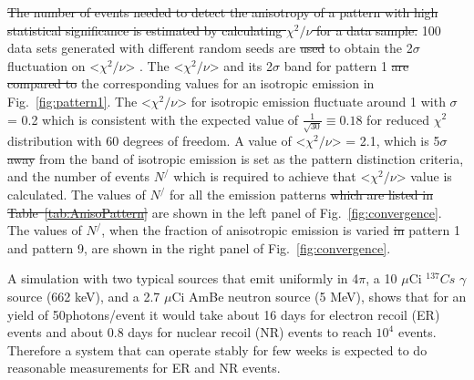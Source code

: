\sout{The number of events needed to detect the anisotropy of a pattern with 
high statistical significance is estimated by calculating $\chi^2/\nu$ 
for a data sample.} 100 data sets generated with different random seeds are 
\sout{used}  to obtain the 2$\sigma$ fluctuation on <$\chi^2/\nu$> . The <$\chi^2/\nu$> 
and its 2$\sigma$ band for pattern 1 \sout{are compared to}  the corresponding values 
for an isotropic emission in Fig.~\ref{fig:pattern1}. The <$\chi^2/\nu$> for 
isotropic emission fluctuate around 1 with $\sigma$ = 0.2 which is consistent with 
the expected value of $\frac{1}{\sqrt{30}} \equiv 0.18$ for reduced $\chi^2$ distribution 
with 60 degrees of freedom. A value of <$\chi^2/\nu$> = 2.1, which is 5$\sigma$ \sout{away} from the 
band of isotropic emission is set as the pattern distinction criteria, and the number of events 
$N^{/}$ which is required to achieve that <$\chi^2/\nu$> value is calculated. The values of 
$N^{/}$  for all the emission patterns \sout{which are listed in Table~\ref{tab:AnisoPattern}} are shown 
in the left panel of Fig.~\ref{fig:convergence}. The values of $N^{/}$, when the fraction of anisotropic 
emission is varied \sout{in} pattern 1 and pattern 9, are shown in the right panel of Fig.~\ref{fig:convergence}. 

A simulation with two typical sources that emit uniformly in 4$\pi$, a 10 $\mu$Ci $^{137}Cs$ $\gamma$ 
source (662 keV), and a 2.7 $\mu$Ci AmBe neutron source (5 MeV), shows that for an yield of 
50photons/event it would take about 16 days for electron recoil (ER) events and about 0.8 days for 
nuclear recoil (NR) events to reach $10^4$ events. Therefore a system that can operate stably for few weeks 
is expected to do reasonable measurements for ER and NR events.

